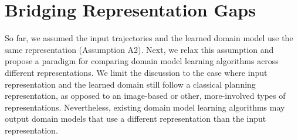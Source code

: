 \documentclass{article}
\theoremstyle{definition}
\theoremstyle{remark}
\newif\ifaddcomments
\newcommand{\roni}[1]{\ifaddcomments{\textcolor{red}{[Roni: #1]}}\fi}
\newcommand{\leo}[1]{\ifaddcomments{\textcolor{pink}{[Leonardo: #1]}}\fi}
\begin{document}
\section{Bridging Representation Gaps}
\label{sec:bridging-gap}
So far, we assumed the input trajectories and the learned domain model use the same representation (Assumption A2). Next, we relax this assumption and propose a paradigm for comparing domain model learning algorithms across different representations. 
We limit the discussion to the case where input representation and the learned domain still follow a classical planning representation, as opposed to an image-based or other, more-involved types of representations. 
Nevertheless, existing domain model learning algorithms may output domain models that use a different representation than the input representation.
\end{document}

